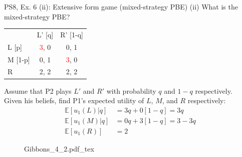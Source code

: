 \begin{frame}{PS8, Ex. 6 (ii): Extensive form game (mixed-strategy PBE)}
    (ii) What is the mixed-strategy PBE? \vspace{-8pt}
    \begin{multicols}{2}
      \begin{table}
        \begin{tabular}{l|c|c|}
          \multicolumn{1}{c}{} & \multicolumn{1}{c}{L' [q]} & \multicolumn{1}{c}{R' [1-q]} \\\cline{2-3}
          L [p]   & \textcolor{red}{3}, 0 & 0, \color{blue}1 \\\cline{2-3}
          M [1-p] & 0, \color{blue}1 & \textcolor{red}{3}, 0 \\\cline{2-3}
          R       & 2, \color{blue}2 & 2, \color{blue}2 \\\cline{2-3}
        \end{tabular}
      \end{table} \vspace{-4pt}
      Assume that P2 plays $L'$ and $R'$ with probability $q$ and $1-q$ respectively.\\\smallskip
      Given his beliefs, find P1's expected utility of $L$, $M$, and $R$ respectively: \vspace{-4pt}
      \begin{align*}
        \mathbb{E}[u_1(L)|q]&=3q+0[1-q]=3q\\
        \mathbb{E}[u_1(M)|q]&=0q+3[1-q]=3-3q\\
        \mathbb{E}[u_1(R)]&=2
      \end{align*}
      \vfill\null\columnbreak
      \begin{figure}[!h]
        \center {}
        {Gibbons_4_2.pdf_tex}
      \end{figure}
      \vfill\null
    \end{multicols}
\end{frame}
